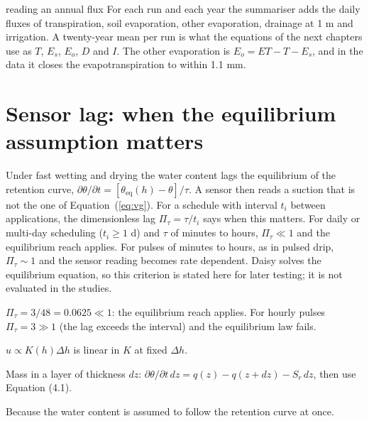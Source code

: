 \begin{daisybox}{reading an annual flux}
For each run and each year the summariser adds the daily fluxes of transpiration, soil evaporation, other evaporation, drainage at 1 m and irrigation. A twenty-year mean per run is what the equations of the next chapters use as $T$, $E_s$, $E_o$, $D$ and $I$. The other evaporation is $E_o=ET-T-E_s$, and in the data it closes the evapotranspiration to within 1.1 mm.
\end{daisybox}

\section{Sensor lag: when the equilibrium assumption matters}\label{sec:lag}
Under fast wetting and drying the water content lags the equilibrium of the retention curve, $\partial\theta/\partial t=[\theta_{\mathrm{eq}}(h)-\theta]/\tau$. A sensor then reads a suction that is not the one of Equation~(\ref{eq:vg}). For a schedule with interval $t_i$ between applications, the dimensionless lag $\Pi_\tau=\tau/t_i$ says when this matters. For daily or multi-day scheduling ($t_i\ge1$ d) and $\tau$ of minutes to hours, $\Pi_\tau\ll1$ and the equilibrium reach applies. For pulses of minutes to hours, as in pulsed drip, $\Pi_\tau\sim1$ and the sensor reading becomes rate dependent. Daisy solves the equilibrium equation, so this criterion is stated here for later testing; it is not evaluated in the studies.

\sol  $\Pi_\tau=3/48=0.0625\ll1$: the equilibrium reach applies. For hourly pulses $\Pi_\tau=3\gg1$ (the lag exceeds the interval) and the equilibrium law fails.

\sol  $u\propto K(h)\Delta h$ is linear in $K$ at fixed $\Delta h$.

\sol  Mass in a layer of thickness $dz$: $\partial\theta/\partial t\,dz=q(z)-q(z+dz)-S_r\,dz$, then use Equation (4.1).

\sol  Because the water content is assumed to follow the retention curve at once.


